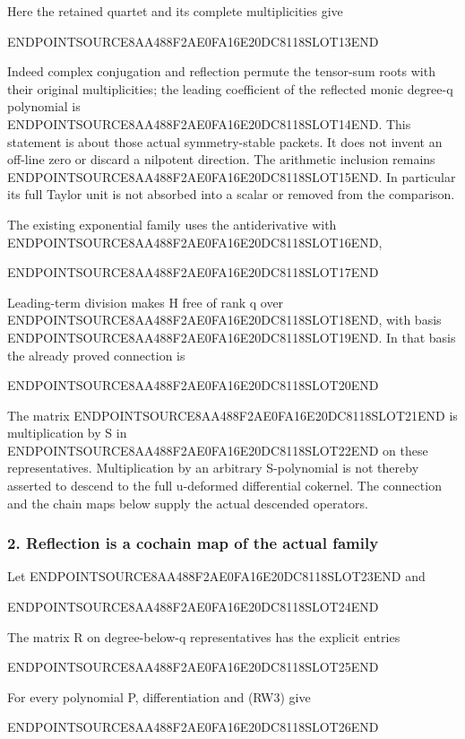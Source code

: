 Here the retained quartet and its complete multiplicities give

ENDPOINTSOURCE8AA488F2AE0FA16E20DC8118SLOT13END

Indeed complex conjugation and reflection permute the tensor-sum roots with their original multiplicities; the leading coefficient of the reflected monic degree-q polynomial is ENDPOINTSOURCE8AA488F2AE0FA16E20DC8118SLOT14END. This statement is about those actual symmetry-stable packets. It does not invent an off-line zero or discard a nilpotent direction. The arithmetic inclusion remains ENDPOINTSOURCE8AA488F2AE0FA16E20DC8118SLOT15END. In particular its full Taylor unit is not absorbed into a scalar or removed from the comparison.

The existing exponential family uses the antiderivative with ENDPOINTSOURCE8AA488F2AE0FA16E20DC8118SLOT16END,

ENDPOINTSOURCE8AA488F2AE0FA16E20DC8118SLOT17END

Leading-term division makes H free of rank q over ENDPOINTSOURCE8AA488F2AE0FA16E20DC8118SLOT18END, with basis ENDPOINTSOURCE8AA488F2AE0FA16E20DC8118SLOT19END. In that basis the already proved connection is

ENDPOINTSOURCE8AA488F2AE0FA16E20DC8118SLOT20END

The matrix ENDPOINTSOURCE8AA488F2AE0FA16E20DC8118SLOT21END is multiplication by S in ENDPOINTSOURCE8AA488F2AE0FA16E20DC8118SLOT22END on these representatives. Multiplication by an arbitrary S-polynomial is not thereby asserted to descend to the full u-deformed differential cokernel. The connection and the chain maps below supply the actual descended operators.

\subsubsection{2. Reflection is a cochain map of the actual family}\label{endpoint-f1_reflection--reflection-is-a-cochain-map-of-the-actual-family}

Let ENDPOINTSOURCE8AA488F2AE0FA16E20DC8118SLOT23END and

ENDPOINTSOURCE8AA488F2AE0FA16E20DC8118SLOT24END

The matrix R on degree-below-q representatives has the explicit entries

ENDPOINTSOURCE8AA488F2AE0FA16E20DC8118SLOT25END

For every polynomial P, differentiation and (RW3) give

ENDPOINTSOURCE8AA488F2AE0FA16E20DC8118SLOT26END

